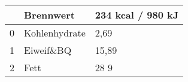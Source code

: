 \begin{tabular}{lll}
\toprule
{} &      Brennwert & 234 kcal / 980 kJ \\
\midrule
0 &  Kohlenhydrate &              2,69 \\
1 &      Eiweif\&BQ &             15,89 \\
2 &           Fett &              28 9 \\
\bottomrule
\end{tabular}
